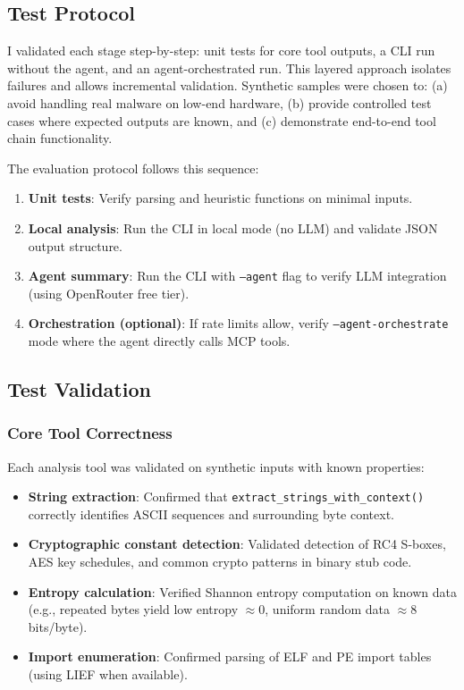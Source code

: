 \documentclass[11pt]{article}
\begin{document}
\subsection{Test Protocol}
I validated each stage step-by-step: unit tests for core tool outputs, a CLI run without the agent, and an agent-orchestrated run. This layered approach isolates failures and allows incremental validation. Synthetic samples were chosen to: (a) avoid handling real malware on low-end hardware, (b) provide controlled test cases where expected outputs are known, and (c) demonstrate end-to-end tool chain functionality.

The evaluation protocol follows this sequence:
\begin{enumerate}
  \item \textbf{Unit tests}: Verify parsing and heuristic functions on minimal inputs.
  \item \textbf{Local analysis}: Run the CLI in local mode (no LLM) and validate JSON output structure.
  \item \textbf{Agent summary}: Run the CLI with \texttt{--agent} flag to verify LLM integration (using OpenRouter free tier).
  \item \textbf{Orchestration (optional)}: If rate limits allow, verify \texttt{--agent-orchestrate} mode where the agent directly calls MCP tools.
\end{enumerate}

\subsection{Test Validation}
\subsubsection{Core Tool Correctness}
Each analysis tool was validated on synthetic inputs with known properties:
\begin{itemize}[leftmargin=*]
  \item \textbf{String extraction}: Confirmed that \texttt{extract\_strings\_with\_context()} correctly identifies ASCII sequences and surrounding byte context.
  \item \textbf{Cryptographic constant detection}: Validated detection of RC4 S-boxes, AES key schedules, and common crypto patterns in binary stub code.
  \item \textbf{Entropy calculation}: Verified Shannon entropy computation on known data (e.g., repeated bytes yield low entropy $\approx 0$, uniform random data $\approx 8$ bits/byte).
  \item \textbf{Import enumeration}: Confirmed parsing of ELF and PE import tables (using LIEF when available).
\end{itemize}
\end{document}
